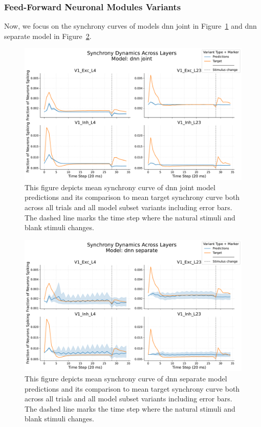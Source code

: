 \subsubsection{Feed-Forward Neuronal Modules Variants}
\label{{subsubsec:dnn_eval}}
Now, we focus on the synchrony curves of models dnn joint in Figure~\ref{fig:synchrony_curve_dnn_joint} and dnn separate model in Figure~\ref{fig:synchrony_curve_dnn_separate}.
\begin{figure}
    \centering
    \includegraphics[width=\linewidth]{img/plots/separate_model_synchrony_curve_dnn_joint_evaluation.pdf}
    \caption{This figure depicts mean synchrony curve of dnn joint model predictions and its comparison to mean target synchrony curve both across all trials and all model subset variants including error bars. The dashed line marks the time step where the natural stimuli and blank stimuli changes.}
    \label{fig:synchrony_curve_dnn_joint}
\end{figure}

\begin{figure}
    \centering
    \includegraphics[width=\linewidth]{img/plots/separate_model_synchrony_curve_dnn_separate_evaluation.pdf}
    \caption{This figure depicts mean synchrony curve of dnn separate model predictions and its comparison to mean target synchrony curve both across all trials and all model subset variants including error bars. The dashed line marks the time step where the natural stimuli and blank stimuli changes.}
    \label{fig:synchrony_curve_dnn_separate}
\end{figure}

